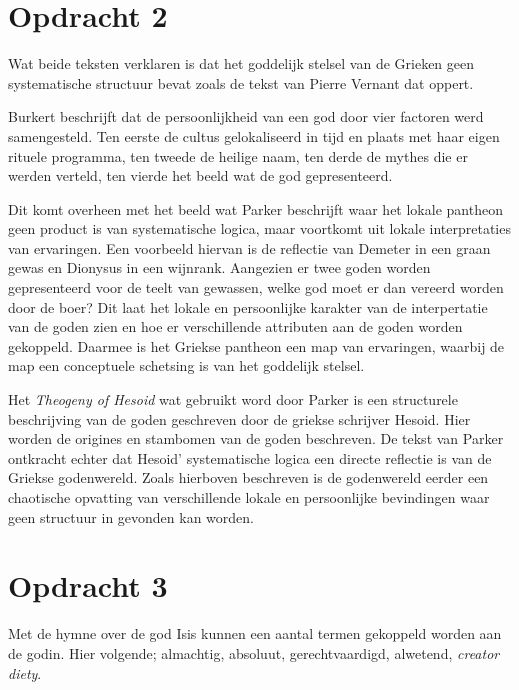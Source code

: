 \documentclass[10pt]{amsart}
\begin{document}
\section*{Opdracht 2}\label{opdracht2}
Wat beide teksten\autocite{parkerPolytheismSocietyAthens2005}\autocite{burkertGreekReligionArchaic1985} verklaren is dat het goddelijk stelsel van de Grieken geen systematische structuur bevat zoals de tekst van Pierre Vernant \autocite{vernantGreceAncienneEtude1976} dat oppert.

Burkert beschrijft dat de persoonlijkheid van een god door vier factoren werd samengesteld. Ten eerste de cultus
gelokaliseerd in tijd en plaats met haar eigen rituele programma, ten tweede de heilige naam, ten derde de mythes die
er werden verteld, ten vierde het beeld wat de god gepresenteerd.\autocite{burkertGreekReligionArchaic1985}

Dit komt overheen met het beeld wat Parker beschrijft waar het lokale pantheon geen product is van systematische
logica, maar voortkomt uit lokale interpretaties van ervaringen. Een voorbeeld hiervan is de reflectie van Demeter in
een graan gewas en Dionysus in een wijnrank. Aangezien er twee goden worden gepresenteerd voor de teelt van gewassen,
welke god moet er dan vereerd worden door de boer? Dit laat het lokale en persoonlijke karakter van de interpertatie
van de goden zien en hoe er verschillende attributen aan de goden worden gekoppeld. Daarmee is het Griekse pantheon een
map van ervaringen, waarbij de map een conceptuele schetsing is van het goddelijk
stelsel.\autocite{parkerPolytheismSocietyAthens2005}

Het \textit{Theogeny of Hesoid} wat gebruikt word door Parker\autocite{parkerPolytheismSocietyAthens2005} is een
structurele beschrijving van de goden geschreven door de griekse schrijver Hesoid\autocite{atsmaHESIODTHEOGONY2017}.
Hier worden de origines en stambomen van de goden beschreven. De tekst van Parker ontkracht echter dat Hesoid'
systematische logica een directe reflectie is van de Griekse godenwereld. Zoals hierboven beschreven is de godenwereld
eerder een chaotische opvatting van verschillende lokale en persoonlijke bevindingen waar geen structuur in gevonden
kan worden.

\section*{Opdracht 3}
Met de hymne over de god Isis\autocite{i.AretologieVanIsis} kunnen een aantal termen gekoppeld worden aan de godin. Hier volgende; almachtig, absoluut, gerechtvaardigd, alwetend, \textit{creator diety}.
\end{document}

